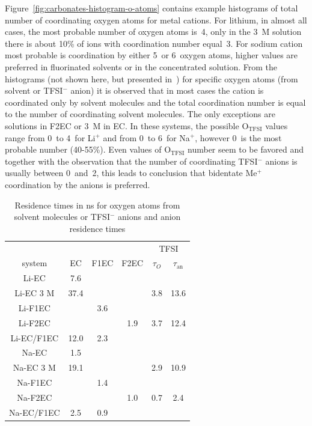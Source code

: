 Figure~\ref{fig:carbonates-histogram-o-atoms} contains example histograms of total number of coordinating oxygen atoms for metal cations. For lithium, in almost all cases, the most probable number of oxygen atoms is~4, only in the 3~M solution there is about 10\% of ions with coordination number equal~3. For sodium cation most probable is coordination by either 5~or 6~oxygen atoms, higher values are preferred in fluorinated solvents or in the concentrated solution. From the histograms (not shown here, but presented in~\cite{carbonates}) for specific oxygen atoms (from solvent or TFSI$^{-}$ anion) it is observed that in most cases the cation is coordinated only by solvent molecules and the total coordination number is equal to the number of coordinating solvent molecules. The only exceptions are solutions in F2EC or 3~M in EC. In these systems, the possible O$_{\text{TFSI}}$ values range from 0~to 4~for Li$^{+}$ and from 0~to 6~for Na$^{+}$, however 0~is the most probable number (40-55\%). Even values of O$_{\text{TFSI}}$ number seem to be favored and together with the observation that the number of coordinating TFSI$^{-}$ anions is usually between 0~and~2, this leads to conclusion that bidentate Me$^{+}$ coordination by the anions is preferred.

\begin{table}[ht]
  \centering
  \caption{Residence times in ns for oxygen atoms from solvent molecules or TFSI$^{-}$ anions and anion residence times}
  \label{tab:carbonates-residence}
\begin{tabular}{cccccc}
\toprule
           &      &      &      & \multicolumn{2}{c}{TFSI} \\
system     & EC   & F1EC & F2EC & $\tau_O$         & $\tau_{\text{an}}$         \\
\midrule
Li-EC      & 7.6  &      &      &            &             \\
Li-EC 3 M  & 37.4 &      &      & 3.8        & 13.6        \\
Li-F1EC    &      & 3.6  &      &            &             \\
Li-F2EC    &      &      & 1.9  & 3.7        & 12.4        \\
Li-EC/F1EC & 12.0 & 2.3  &      &            &             \\
Na-EC      & 1.5  &      &      &            &             \\
Na-EC 3 M  & 19.1 &      &      & 2.9        & 10.9        \\
Na-F1EC    &      & 1.4  &      &            &             \\
Na-F2EC    &      &      & 1.0  & 0.7        & 2.4         \\
Na-EC/F1EC & 2.5  & 0.9  &      &            &             \\
\bottomrule
\end{tabular}
\end{table}

